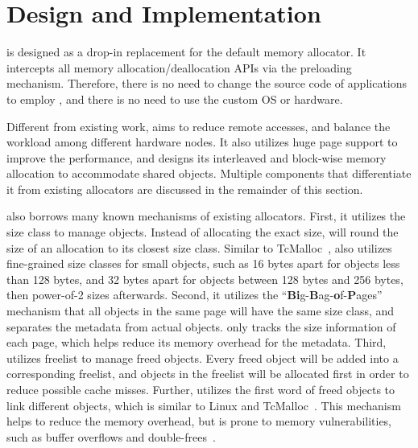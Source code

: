 \section{Design and Implementation}
\label{sec:implement}

\NM{} is designed as a drop-in replacement for the default memory allocator. It intercepts all memory allocation/deallocation APIs via the preloading mechanism. Therefore, there is no need to change the source code of applications to employ \NM{}, and there is no need to use the custom OS or hardware. 

Different from existing work, \NA{} aims to reduce remote accesses, and balance the workload among different hardware nodes. It also utilizes huge page support to improve the performance, and designs its interleaved and block-wise memory allocation to accommodate shared objects. Multiple components that differentiate it from existing allocators are discussed in the remainder of this section. 
  
\NA{} also borrows many known mechanisms of existing allocators. First, it utilizes the size class to manage objects. Instead of allocating the exact size, \NA{} will round the size of an allocation to its closest size class. Similar to TcMalloc~\cite{tcmalloc}, \NA{} also utilizes fine-grained size classes for small objects, such as 16 bytes apart for objects less than 128 bytes, and 32 bytes apart for objects between 128 bytes and 256 bytes, then power-of-2 sizes afterwards. Second, it utilizes the ``\textbf{Bi}g-\textbf{B}ag-\textbf{o}f-\textbf{P}ages'' mechanism that all objects in the same page will have the same size class, and separates the metadata from actual objects. \NA{} only tracks the size information of each page, which helps reduce its memory overhead for the metadata. Third, \NA{} utilizes freelist to manage freed objects. Every freed object will be added into a corresponding freelist, and objects in the freelist will be allocated first in order to reduce possible cache misses. Further, \NA{} utilizes the first word of freed objects to link different objects, which is similar to Linux and TcMalloc~\cite{tcmalloc}. This mechanism helps to reduce the memory overhead, but is prone to memory vulnerabilities, such as buffer overflows and double-frees~\cite{DieHarder, Guarder}.     

